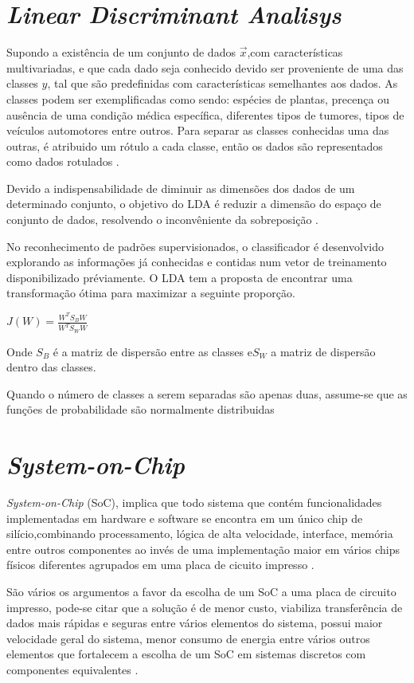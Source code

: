 \section{\textit{Linear Discriminant Analisys}}
Supondo a existência de um conjunto de dados $\vec x$,com características multivariadas, e que cada dado
seja conhecido devido ser proveniente de uma das  classes $y$, tal que são predefinidas com características
semelhantes aos dados. As classes podem ser exemplificadas como sendo: espécies de plantas,
precença ou ausência de uma condição médica específica, diferentes tipos de tumores, tipos de veículos automotores
entre outros. Para separar as classes conhecidas uma das outras, é atribuido um rótulo a cada classe, então os dados são
representados como dados rotulados \cite{izenmanLDA}.


Devido a indispensabilidade de diminuir as dimensões dos dados de um determinado conjunto, o objetivo do LDA
é reduzir a dimensão do espaço de conjunto de dados, resolvendo o inconvêniente da sobreposição \cite{SinghLDA}.

No reconhecimento de padrões supervisionados, o classificador é desenvolvido explorando as informações 
já conhecidas e contidas num vetor de treinamento disponibilizado préviamente\cite{izenmanLDA}. O LDA tem a 
proposta de encontrar uma transformação ótima para maximizar a seguinte proporção.

$J(W) = \frac { W^T S_B W}{W^T S_W W}$

Onde $S_B$ é a matriz de dispersão entre as classes e$ S_W$ a matriz de dispersão dentro das classes. 

Quando o número de classes a serem separadas são apenas duas, assume-se que as funções de probabilidade
são normalmente distribuidas

\section{\textit{System-on-Chip}}

\textit{System-on-Chip} (SoC), implica que todo sistema que contém funcionalidades implementadas em hardware e software se encontra em um único chip de silício,combinando processamento, lógica de alta velocidade, interface, memória entre outros componentes ao invés de uma implementação maior em vários chips físicos diferentes agrupados em uma placa 
de cicuito impresso \cite{zynqBook}.

São vários os argumentos a favor da escolha de um SoC a uma placa de circuito impresso, pode-se citar que a solução é de menor custo, viabiliza transferência de dados mais rápidas e seguras entre vários elementos do sistema, possui maior velocidade geral do sistema, menor consumo de energia entre vários outros elementos que fortalecem a escolha de um SoC em sistemas discretos com componentes equivalentes \cite{zynqBook}.

